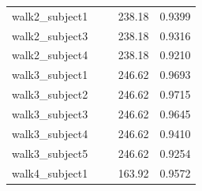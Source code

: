 \begin{longtable}{@{}p{0.57\linewidth}rr@{}}
walk2\_subject1 & 238.18 & 0.9399 \\
walk2\_subject3 & 238.18 & 0.9316 \\
walk2\_subject4 & 238.18 & 0.9210 \\
walk3\_subject1 & 246.62 & 0.9693 \\
walk3\_subject2 & 246.62 & 0.9715 \\
walk3\_subject3 & 246.62 & 0.9645 \\
walk3\_subject4 & 246.62 & 0.9410 \\
walk3\_subject5 & 246.62 & 0.9254 \\
walk4\_subject1 & 163.92 & 0.9572 \\
\bottomrule
\end{longtable}
